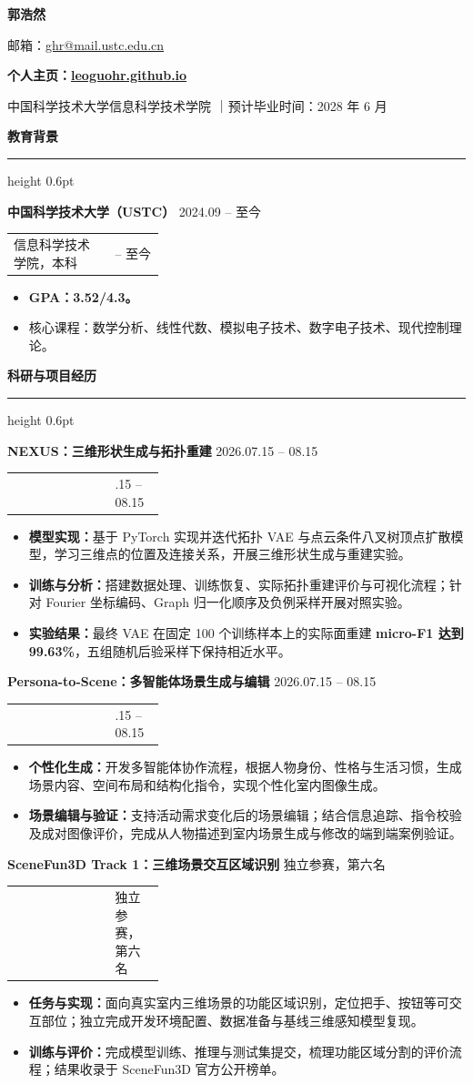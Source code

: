 \documentclass[10pt,a4paper,fontset=fandol]{ctexart}
\makeatletter
\newcommand{\nameblock}[1]{
  {\centering\fontsize{20pt}{22pt}\selectfont\bfseries #1\par}
  \vspace{0.6em}
}
\newcommand{\centerlinecn}[1]{
  {\centering\small\color{textgray} #1\par}
  \vspace{0.35em}
}
\newcommand{\resumesection}[1]{
  \vspace{0.72em}
  {\large\bfseries\color{accent} #1\par}
  \vspace{0.22em}
  {\color{accent}\hrule height 0.6pt}
  \vspace{0.32em}
}
\newcommand{\entry}[4]{
  \vspace{0.35em}
  {\normalsize\bfseries #1}
  \if\relax\detokenize{#3}\relax
    \hfill{\small\color{textgray}#4}\par
  \else
    \par
    \begin{tabularx}{\linewidth}{@{}>{\small\color{textgray}\RaggedRight\arraybackslash}X >{\small\color{textgray}\RaggedLeft\arraybackslash}p{0.33\linewidth}@{}}
      #3 & #4
    \end{tabularx}
  \fi
  \par\vspace{0.08em}
}
\makeatother
\begin{document}
\nameblock{郭浩然}
\centerlinecn{邮箱：\href{mailto:ghr@mail.ustc.edu.cn}{ghr@mail.ustc.edu.cn}}
\centerlinecn{{\normalsize\bfseries\color{black} 个人主页：\href{https://leoguohr.github.io/}{leoguohr.github.io}}}
\centerlinecn{中国科学技术大学信息科学技术学院 \quad｜\quad 预计毕业时间：2028 年 6 月}
\vspace{0.18em}

\resumesection{教育背景}
\entry{中国科学技术大学（USTC）}{}{信息科学技术学院，本科}{2024.09 -- 至今}
\begin{itemize}
  \item \textbf{GPA：3.52/4.3。}
  \item 核心课程：数学分析、线性代数、模拟电子技术、数字电子技术、现代控制理论。
\end{itemize}

\resumesection{科研与项目经历}

\entry{NEXUS：三维形状生成与拓扑重建}{}{}{2026.07.15 -- 08.15}
\begin{itemize}
  \item \textbf{模型实现：}基于 PyTorch 实现并迭代拓扑 VAE 与点云条件八叉树顶点扩散模型，学习三维点的位置及连接关系，开展三维形状生成与重建实验。
  \item \textbf{训练与分析：}搭建数据处理、训练恢复、实际拓扑重建评价与可视化流程；针对 Fourier 坐标编码、Graph 归一化顺序及负例采样开展对照实验。
  \item \textbf{实验结果：}最终 VAE 在固定 100 个训练样本上的实际面重建 \textbf{micro-F1 达到 99.63\%}，五组随机后验采样下保持相近水平。
\end{itemize}

\entry{Persona-to-Scene：多智能体场景生成与编辑}{}{}{2026.07.15 -- 08.15}
\begin{itemize}
  \item \textbf{个性化生成：}开发多智能体协作流程，根据人物身份、性格与生活习惯，生成场景内容、空间布局和结构化指令，实现个性化室内图像生成。
  \item \textbf{场景编辑与验证：}支持活动需求变化后的场景编辑；结合信息追踪、指令校验及成对图像评价，完成从人物描述到室内场景生成与修改的端到端案例验证。
\end{itemize}

\entry{SceneFun3D Track 1：三维场景交互区域识别}{}{}{独立参赛，第六名}
\begin{itemize}
  \item \textbf{任务与实现：}面向真实室内三维场景的功能区域识别，定位把手、按钮等可交互部位；独立完成开发环境配置、数据准备与基线三维感知模型复现。
  \item \textbf{训练与评价：}完成模型训练、推理与测试集提交，梳理功能区域分割的评价流程；结果收录于 SceneFun3D 官方公开榜单。
\end{itemize}
\end{document}
